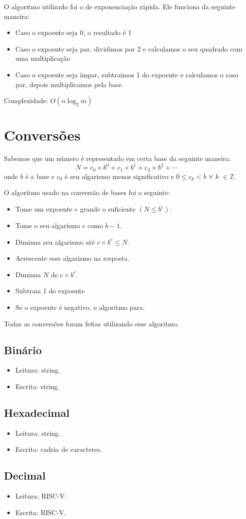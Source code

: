 \documentclass[12pt, letterpaper]{article}
\begin{document}
		O algoritmo utilizado foi o de exponenciação rápida. Ele funciona da seguinte maneira:
		\begin{itemize}
			\item{Caso o expoente seja 0, o resultado é 1}
			\item{Caso o expoente seja par, dividimos por 2 e calculamos o seu quadrado com uma multiplicação}
			\item{Caso o expoente seja ímpar, subtraimos 1 do expoente e calculamos o caso par, depois multiplicamos pela base.}
		\end{itemize}
		Complexidade: $O(n\log_2{m})$

\newpage
\section{Conversões}
		Sabemos que um número é representado em certa base da seguinte maneira:
		$$
		N = c_0 \times b^0 + c_1 \times b^1 + c_2 \times b^2 + \cdots
		$$
		onde $b$ é a base e $c_0$ é seu algarismo menos significativo e $0\leq c_k < b$ $\forall$  $k$ $\in \mathbb{Z}$.

		O algoritmo usado na conversão de bases foi o seguinte:
		\begin{itemize}
			\item{Tome um expoente $e$ grande o suficiente $(N \leq b^e)$.}
			\item{Tome o seu algarismo $c$ como $b - 1$.}
			\item{Diminua seu algarismo até $c \times b^e \leq N$.}
			\item{Acrescente esse algarismo na resposta.}
			\item{Diminua $N$ de $c \times b^e$.}
			\item{Subtraia 1 do expoente}
			\item{Se o expoente é negativo, o algoritmo para.}
		\end{itemize}
	Todas as conversões foram feitas utilizando esse algoritmo.

	\subsection{Binário}
		\begin{itemize}
			\item{Leitura: string.}
			\item{Escrita: string.}
		\end{itemize}
	\subsection{Hexadecimal}
		\begin{itemize}
			\item{Leitura: string.}
			\item{Escrita: cadeia de caracteres.}
		\end{itemize}

	\subsection{Decimal}
		\begin{itemize}
			\item{Leitura: RISC-V.}
			\item{Escrita: RISC-V.}
		\end{itemize}
\end{document}
